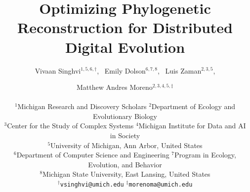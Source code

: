 \title{Optimizing Phylogenetic Reconstruction for Distributed Digital Evolution}

\author{
    Vivaan Singhvi$^{1,5,6,\dagger}$,\ %
    Emily Dolson$^{6,7,8}$,\ %
    Luis Zaman$^{2,3,5}$, \and
    Matthew Andres Moreno$^{2,3,4,5,\ddagger}$ \\
    \mbox{}\\
    $^1$Michigan Research and Discovery Scholars
    $^2$Department of Ecology and Evolutionary Biology \\
    $^3$Center for the Study of Complex Systems
    $^4$Michigan Institute for Data and AI in Society \\
    $^5$University of Michigan, Ann Arbor, United States \\
    $^6$Department of Computer Science and Engineering
    $^7$Program in Ecology, Evolution, and Behavior \\
    $^8$Michigan State University, East Lansing, United States \\
    $^\dagger$\texttt{vsinghvi@umich.edu} $^\ddagger$\texttt{morenoma@umich.edu}
}

\maketitle


\maketitle
